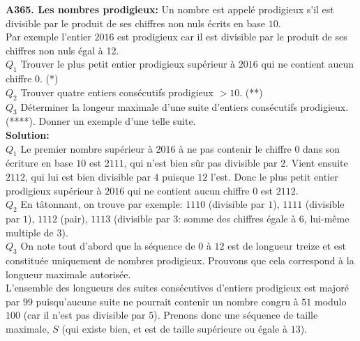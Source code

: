 \documentclass[11pt] {article}
\begin{document}



\textbf{A365. Les nombres prodigieux:} Un nombre est appelé prodigieux s'il est divisible par le produit de ses chiffres non nuls écrits en base $10$.\\
Par exemple l'entier $2016$ est prodigieux car il est divisible par le produit de ses chiffres non nuls égal à 12.\\
$Q_{1}$ Trouver le plus petit entier prodigieux supérieur à $2016$ qui ne contient aucun chiffre $0$. (*)\\
$Q_{2}$ Trouver quatre entiers consécutifs prodigieux $> 10$. (**)\\
$Q_{3}$ Déterminer la longeur maximale d'une suite d'entiers consécutifs prodigieux. (****). Donner un exemple d'une telle suite.\\

\textbf{Solution:}\\
$Q_{1}$ Le premier nombre supérieur à $2016$ à ne pas contenir le chiffre $0$ dans son écriture en base $10$ est $2111$, qui n'est bien sûr pas divisible par $2$. Vient ensuite $2112$, qui lui est bien divisible par $4$ puisque $12$ l'est. Donc le plus petit entier prodigieux supérieur à $2016$ qui ne contient aucun chiffre $0$ est $2112$.\\

$Q_{2}$ En tâtonnant, on trouve par exemple: $1110$ (divisible par $1$), $1111$ (divisible par $1$), $1112$ (pair), $1113$ (divisible par $3$: somme des chiffres égale à $6$, lui-même multiple de $3$).\\

$Q_{3}$ On note tout d'abord que la séquence de $0$ à $12$ est de longueur treize et est constituée uniquement de nombres prodigieux. Prouvons que cela correspond à la longueur maximale autorisée.\\

L'ensemble des longueurs des suites consécutives d'entiers prodigieux est majoré par $99$ puisqu'aucune suite ne pourrait contenir un nombre congru à $51$ modulo $100$ (car il n'est pas divisible par $5$).
Prenons donc une séquence de taille maximale, $S$ (qui existe bien, et est de taille supérieure ou égale à $13$).\\
\end{document}
